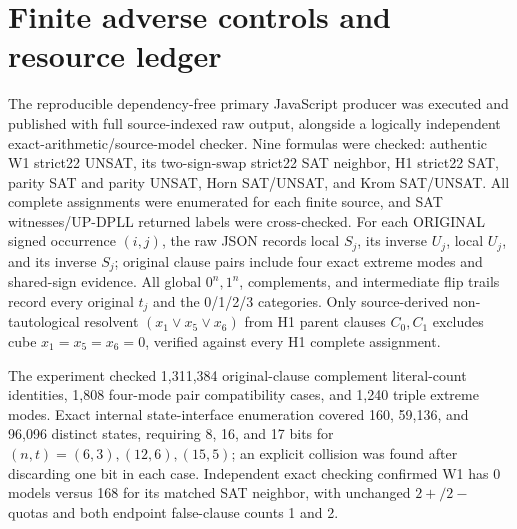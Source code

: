 \documentclass[11pt]{article}
\begin{document}
\section{Finite adverse controls and resource ledger}
The reproducible dependency-free primary JavaScript producer was executed and published with full source-indexed raw output, alongside a logically independent exact-arithmetic/source-model checker. Nine formulas were checked: authentic W1 strict22 UNSAT, its two-sign-swap strict22 SAT neighbor, H1 strict22 SAT, parity SAT and parity UNSAT, Horn SAT/UNSAT, and Krom SAT/UNSAT. All complete assignments were enumerated for each finite source, and SAT witnesses/UP-DPLL returned labels were cross-checked. For each ORIGINAL signed occurrence $(i,j)$, the raw JSON records local $S_j$, its inverse $U_j$, local $U_j$, and its inverse $S_j$; original clause pairs include four exact extreme modes and shared-sign evidence. All global $0^n,1^n$, complements, and intermediate flip trails record every original $t_j$ and the 0/1/2/3 categories. Only source-derived non-tautological resolvent $(x_1\vee x_5\vee x_6)$ from H1 parent clauses $C_0,C_1$ excludes cube $x_1=x_5=x_6=0$, verified against every H1 complete assignment.

The experiment checked 1,311,384 original-clause complement literal-count identities, 1,808 four-mode pair compatibility cases, and 1,240 triple extreme modes. Exact internal state-interface enumeration covered 160, 59,136, and 96,096 distinct states, requiring 8, 16, and 17 bits for $(n,t)=(6,3),(12,6),(15,5)$; an explicit collision was found after discarding one bit in each case. Independent exact checking confirmed W1 has 0 models versus 168 for its matched SAT neighbor, with unchanged $2+/2-$ quotas and both endpoint false-clause counts 1 and 2.
\end{document}
